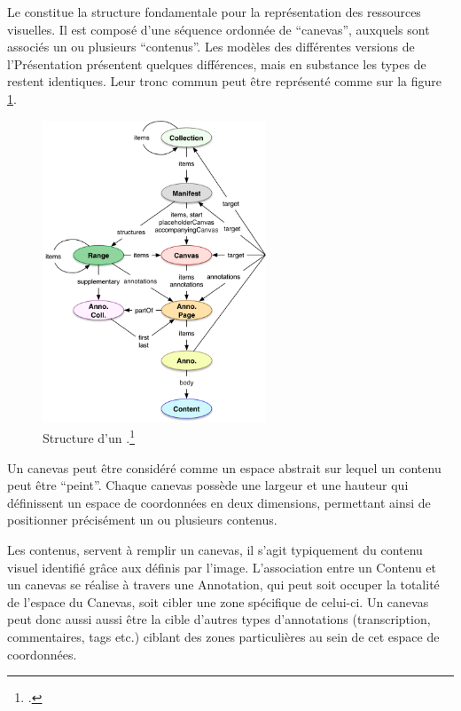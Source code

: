 Le \man \iiif constitue la structure fondamentale pour la
représentation des ressources visuelles. Il est composé d'une séquence
ordonnée de ``canevas'', auxquels sont associés un ou plusieurs
``contenus''. Les modèles des différentes versions de l'\api Présentation
présentent quelques différences, mais en substance les types de
\man restent identiques. Leur tronc commun peut être
représenté comme sur la figure \ref{fig:manifest}.

          \begin{figure}[H]
          \begin{center}
          \includegraphics[height=9cm]{figues/modele_donnees_iiif.png}
          \end{center}
		\caption{Structure d'un \man \iiif.\footcite{appleby_presentation_nodate}}

          \label{fig:manifest} \end{figure}

Un canevas peut être considéré comme un espace abstrait sur lequel un
contenu peut être ``peint''. Chaque canevas possède une largeur et une
hauteur qui définissent un espace de coordonnées en deux dimensions,
permettant ainsi de positionner précisément un ou plusieurs
contenus.

Les contenus, servent à remplir un canevas, il s'agit typiquement du
contenu visuel identifié grâce aux \URLs définis par l'\api image.
L'association entre un Contenu et un canevas se réalise à travers une
Annotation, qui peut soit occuper la totalité de l'espace du Canevas,
soit cibler une zone spécifique de celui-ci. Un canevas peut donc aussi
aussi être la cible d'autres types d'annotations (transcription,
commentaires, tags etc.) ciblant des zones particulières au sein de cet
espace de coordonnées.

